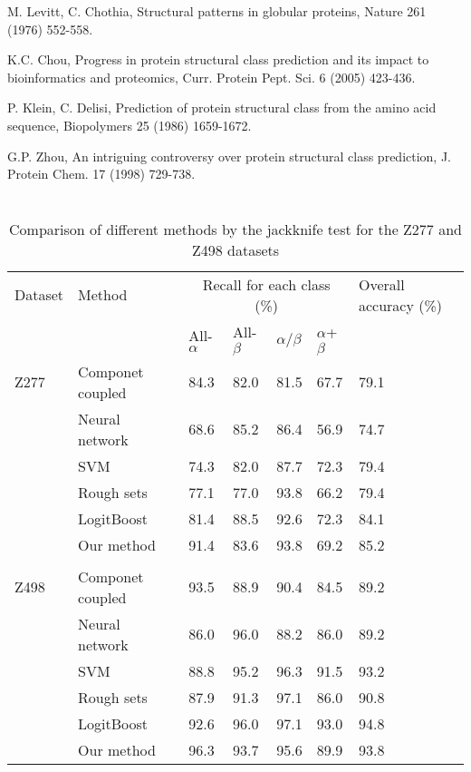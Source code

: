\documentclass[11pt]{article}
\begin{document}
\begin{CJK*}{GBK}{song}
\begin{thebibliography}{99}
\scriptsize

M. Levitt, C. Chothia, Structural patterns in globular proteins,
Nature 261 (1976) 552-558.

K.C. Chou, Progress in protein structural class prediction and its
impact to bioinformatics and proteomics, Curr. Protein Pept. Sci. 6
(2005) 423-436.

P. Klein, C. Delisi, Prediction of protein structural class from the
amino acid sequence, Biopolymers 25 (1986) 1659-1672.

G.P. Zhou, An intriguing controversy over protein structural class
prediction, J. Protein Chem. 17 (1998) 729-738.




\end{thebibliography}


\newpage

\begin{table}[h]
\scriptsize \tabcolsep=15pt \renewcommand{\arraystretch}{1.2}
\renewcommand{\captionlabeldelim}{}
 \onelinecaptionsfalse
\caption{\protect\\Comparison of different methods by the jackknife
test for the Z277 and Z498 datasets}\label{tab3}
\begin{tabular}{@{}lllllll@{}}
  \hline
  Dataset & Method & \multicolumn{4}{c}{Recall for each class (\%)} & Overall accuracy (\%) \\
  \cline{3-6} & & All-$\alpha$ & All-$\beta$ & $\alpha$/$\beta$ & $\alpha$+$\beta$ \\
  \hline
  Z277 & Componet coupled &84.3&82.0&81.5&67.7&79.1\\
  & Neural network &68.6&85.2&86.4&56.9&74.7\\
  & SVM &74.3&82.0&87.7&72.3&79.4\\
  & Rough sets &77.1&77.0&93.8&66.2&79.4\\
  & LogitBoost &81.4&88.5&92.6&72.3&84.1\\
  & Our method &91.4&83.6&93.8&69.2&85.2\\
  \\
  Z498 & Componet coupled &93.5&88.9&90.4&84.5&89.2\\
  & Neural network &86.0&96.0&88.2&86.0&89.2\\
  & SVM &88.8&95.2&96.3&91.5&93.2\\
  & Rough sets &87.9&91.3&97.1&86.0&90.8\\
  & LogitBoost &92.6&96.0&97.1&93.0&94.8\\
  & Our method &96.3&93.7&95.6&89.9&93.8\\
  \hline
\end{tabular}
\end{table}

\end{CJK*}
\end{document}
